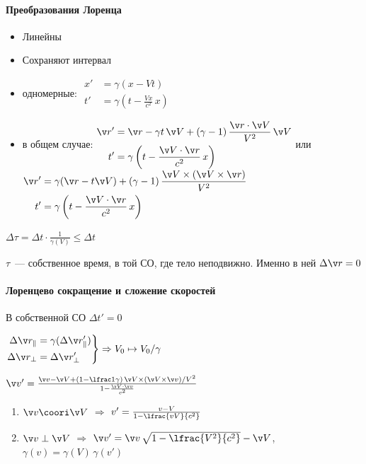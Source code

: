 \documentclass{trchesh}
\begin{document}
\begin{multicols*}{3}
\paragraph{Преобразования Лоренца}
\begin{itemize}
  \item Линейны
  \item Сохраняют интервал
\end{itemize}

\begin{itemize}
  \item одномерные: $
    \begin{aligned}
      x' &= \gamma(x -Vt) \\
      t' &= \gamma(t - \frac{Vx}{c^2} \, x)
    \end{aligned}
    $
  \item в общем случае: $
    \begin{aligned}
      \v r' &= \v r - \gamma t \, \v V + (\gamma-1) \, \frac{\v r\cdot \v V}{V^2}\, \v V \\
      t' &= \gamma\left(t - \frac{\v V\cdot \v r}{c^2} \, x\right)
    \end{aligned}
    $ или
    $\begin{aligned}
      \v r' &= \gamma (\v r -  t \v V) + (\gamma-1) \, \frac{\v V \times (\v V \times \v r)}{V^2} \\
      t' &= \gamma\left(t - \frac{\v V\cdot \v r}{c^2} \, x\right)
    \end{aligned}$
\end{itemize}
$\Delta \tau = \Delta t \cdot \frac {1}{\gamma(V)} \leqslant \Delta t$

$\tau$~--- собственное время, в той СО, где тело неподвижно. Именно в ней $\Delta \v r = 0$
\paragraph{Лоренцево сокращение и сложение скоростей}
В собственной СО $\Delta t' = 0$
\par\vspace{1ex}
$\left.\begin{aligned}
    \Delta \v r_\parallel &= \gamma (\Delta \v r'_\parallel) \\
    \Delta \v r_\perp &= \Delta \v r'_\perp
\end{aligned}\right\}\Rightarrow V_0 \mapsto V_0/\gamma $ 
\par\vspace{1em}
$\v v' = \frac{\v v - \v V + (1-\lfrac 1 \gamma) \, \v V \times (\v V \times \v v)/V^2}
{1-\frac{\v V\cdot\v v}{c^2}}$
\begin{enumerate}
  \item $\v v \coori \v V$ $ \Rightarrow$ $v' = \frac{v - V}{1 -\lfrac{vV}{c^2}}$
  \item $\v v \perp \v V$ $ \Rightarrow$ $\v v' = \v v\, \sqrt{1-\lfrac{V^2}{c^2}} - \v V$,
    $\gamma(v) = \gamma(V)\, \gamma (v')$
\end{enumerate}


\end{multicols*}
\end{document}
